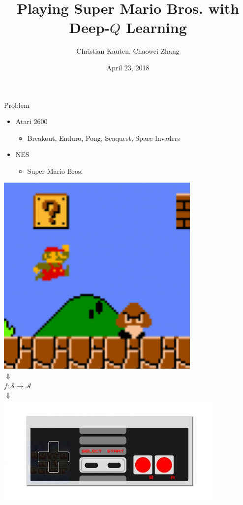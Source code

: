 \documentclass{beamer}
\title{Playing Super Mario Bros. with Deep-$Q$ Learning}
\author{Christian Kauten, Chaowei Zhang}
\institute{Auburn University}
\date{April 23, 2018}
\begin{document}
\frame{\titlepage}



\begin{frame}{Problem}
\begin{minipage}{\textwidth}
%
\begin{minipage}{0.5\textwidth}
\begin{itemize}
    \item{Atari 2600}
        \begin{itemize}
        \item{Breakout, Enduro, Pong, Seaquest, Space Invaders}
        \end{itemize}
    \item{NES}
        \begin{itemize}
        \item{Super Mario Bros.}
        \end{itemize}
\end{itemize}
\end{minipage}
%
\hfill
%
\begin{minipage}[t]{0.5\textwidth}
\centering
\includegraphics[width=0.75\textwidth]{img/smb} \\
$\Downarrow$ \\
$f : \mathcal{S} \to \mathcal{A}$ \\
$\Downarrow$ \\
\includegraphics[width=0.85\textwidth]{img/nes}
\end{minipage}
%
\end{minipage}
\end{frame}
\end{document}
